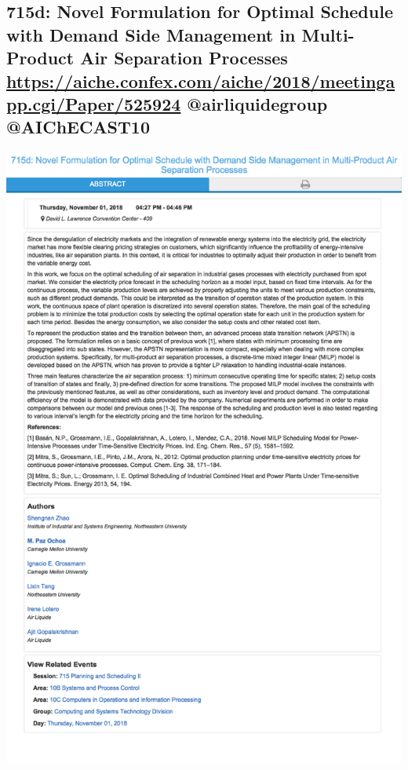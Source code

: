 \documentclass[11pt]{article}
\begin{document}
\subsection{715d: Novel Formulation for Optimal Schedule with Demand Side Management in Multi-Product Air Separation Processes \url{https://aiche.confex.com/aiche/2018/meetingapp.cgi/Paper/525924} @airliquidegroup @AIChECAST10}
\label{sec:org0676149}
\begin{center}
\includegraphics[width=.9\linewidth]{./525924.png}
\end{center}
\end{document}
